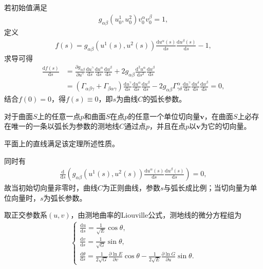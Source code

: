 \documentclass[../../main.tex]{subfiles}%
\begin{document}
若初始值满足
\begin{align}
g_{\alpha\beta}(u_0^1,u_0^2)v_0^\alpha v_0^\beta=1,
\end{align}
定义
\begin{align}
f(s)=g_{\alpha\beta}(u^1(s),u^2(s))\frac{\mathrm{d}u^\alpha(s)}{\mathrm{d}s}\frac{\mathrm{d}u^\beta(s)}{\mathrm{d}s}-1,
\end{align}
求导可得
\begin{align*}
\frac{\mathrm{d}f(s)}{\mathrm{d}s}&=\frac{\partial g_{\alpha\beta}}{\partial u^\gamma}\frac{\mathrm{d}u^\gamma}{\mathrm{d}s}\frac{\mathrm{d}u^\alpha}{\mathrm{d}s}\frac{\mathrm{d}u^\beta}{\mathrm{d}s}+2g_{\alpha\beta}\frac{\mathrm{d}^2u^\alpha}{\mathrm{d}s^2}\frac{\mathrm{d}u^\beta}{\mathrm{d}s}\\
&=(\Gamma_{\alpha\beta\gamma}+\Gamma_{\beta\alpha\gamma})\frac{\mathrm{d}u^\gamma}{\mathrm{d}s}\frac{\mathrm{d}u^\alpha}{\mathrm{d}s}\frac{\mathrm{d}u^\beta}{\mathrm{d}s}-2g_{\alpha\beta}\Gamma^\alpha_{\gamma\delta}\frac{\mathrm{d}u^\gamma}{\mathrm{d}s}\frac{\mathrm{d}u^\delta}{\mathrm{d}s}\frac{\mathrm{d}u^\beta}{\mathrm{d}s}=0,
\end{align*}
结合$f(0)=0$，得$f(s)\equiv0$，即$s$为曲线$C$的弧长参数。

\begin{theorem}
对于曲面$S$上的任意一点$p$和曲面$S$在点$p$的任意一个单位切向量$\boldsymbol{v}$，在曲面$S$上必存在唯一的一条以弧长为参数的测地线$C$通过点$p$，并且在点$p$以$\boldsymbol{v}$为它的切向量。
\end{theorem}

\begin{remark}
平面上的直线满足该定理所述性质。
\end{remark}

同时有
\begin{align}
\frac{\mathrm{d}}{\mathrm{d}s}\left(g_{\alpha\beta}(u^1(s),u^2(s))\frac{\mathrm{d}u^\alpha(s)}{\mathrm{d}s}\frac{\mathrm{d}u^\beta(s)}{\mathrm{d}s}\right)=0,
\end{align}
故当初始切向量非零时，曲线$C$为正则曲线，参数$s$与弧长成比例；当切向量为单位向量时，$s$为弧长参数。

取正交参数系$(u,v)$，由测地曲率的Liouville公式，测地线的微分方程组为
\begin{align}
\begin{cases}
\frac{\mathrm{d}u}{\mathrm{d}s}=\frac{1}{\sqrt{E}}\cos\theta,\\
\frac{\mathrm{d}v}{\mathrm{d}s}=\frac{1}{\sqrt{G}}\sin\theta,\\
\frac{\mathrm{d}\theta}{\mathrm{d}s}=\frac{1}{2\sqrt{G}}\frac{\partial\ln E}{\partial v}\cos\theta-\frac{1}{2\sqrt{E}}\frac{\partial\ln G}{\partial u}\sin\theta.
\end{cases}
\end{align}
\end{document}
